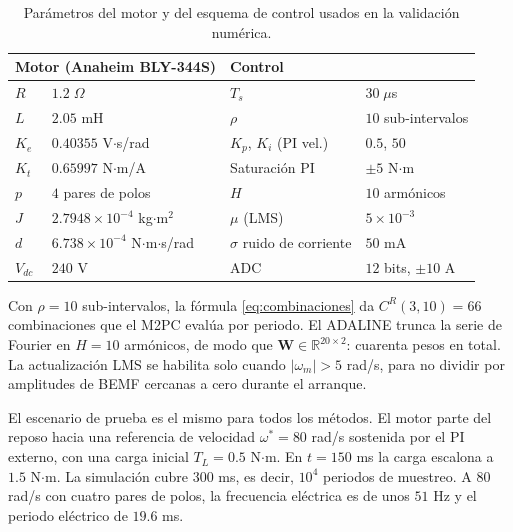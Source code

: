 \documentclass[../../../Tesis_JALS_Maestria.tex]{subfiles}
\begin{document}
\begin{table}[htbp]
    \centering
    \caption{Parámetros del motor y del esquema de control usados en la validación numérica.}
    \label{tab:params-sim}
    \begin{tabular}{llll}
        \toprule
        \multicolumn{2}{l}{Motor (Anaheim BLY-344S)} & \multicolumn{2}{l}{Control} \\
        \midrule
        $R$   & $1.2\;\Omega$                & $T_s$        & $30\;\mu$s \\
        $L$   & $2.05$ mH                    & $\rho$       & $10$ sub-intervalos \\
        $K_e$ & $0.40355$ V$\cdot$s/rad      & $K_p$, $K_i$ (PI vel.) & $0.5$, $50$ \\
        $K_t$ & $0.65997$ N$\cdot$m/A        & Saturación PI & $\pm 5$ N$\cdot$m \\
        $p$   & $4$ pares de polos           & $H$          & $10$ armónicos \\
        $J$   & $2.7948\times 10^{-4}$ kg$\cdot$m$^2$ & $\mu$ (LMS) & $5\times 10^{-3}$ \\
        $d$   & $6.738\times 10^{-4}$ N$\cdot$m$\cdot$s/rad & $\sigma$ ruido de corriente & $50$ mA \\
        $V_{dc}$ & $240$ V                   & ADC          & $12$ bits, $\pm 10$ A \\
        \bottomrule
    \end{tabular}
\end{table}

Con $\rho = 10$ sub-intervalos, la fórmula \eqref{eq:combinaciones} da $C^R(3,10) = 66$ combinaciones que el M2PC evalúa por periodo. El ADALINE trunca la serie de Fourier en $H = 10$ armónicos, de modo que $\mathbf{W} \in \mathbb{R}^{20\times 2}$: cuarenta pesos en total. La actualización LMS se habilita solo cuando $|\omega_m| > 5$ rad/s, para no dividir por amplitudes de BEMF cercanas a cero durante el arranque.

El escenario de prueba es el mismo para todos los métodos. El motor parte del reposo hacia una referencia de velocidad $\omega^* = 80$ rad/s sostenida por el PI externo, con una carga inicial $T_L = 0.5$ N$\cdot$m. En $t = 150$ ms la carga escalona a $1.5$ N$\cdot$m. La simulación cubre $300$ ms, es decir, $10^4$ periodos de muestreo. A $80$ rad/s con cuatro pares de polos, la frecuencia eléctrica es de unos $51$ Hz y el periodo eléctrico de $19.6$ ms.
\end{document}
